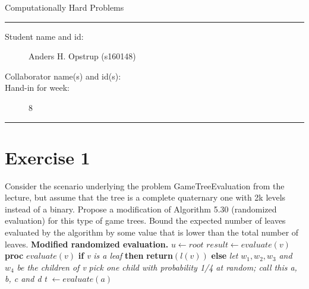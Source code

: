 \documentclass[11pt]{article}
\begin{document}
\begin{center}
{{\Large \sc Computationally Hard Problems}}
\end{center}
\rule{\textwidth}{1pt}
\begin{description}
\item[Student name and id:] Anders H. Opstrup (s160148)
\item[Collaborator name(s) and id(s):]
\item[Hand-in for week:] 8
\end{description}
\rule{\textwidth}{1pt}


\section*{Exercise 1}

Consider the scenario underlying the problem GameTreeEvaluation from the lecture, but assume that the tree is a complete quaternary one with 2k levels instead of a binary. Propose a modification of Algorithm 5.30 (randomized evaluation) for this type of game trees. Bound the expected number of leaves evaluated by the algorithm by some value that is lower than the total number of leaves. \newline \newline
\textbf{Modified randomized evaluation.} \newline \newline
$u \leftarrow root$ \newline
$result \leftarrow evaluate(v)$ \newline \newline
\textbf{proc} $evaluate(v)$ \newline
\textbf{if} \textit{v is a leaf} \textbf{then} \newline
\textbf{return}$(l(v))$ \newline
\textbf{else} \newline
\textit{let} $w_{1}, w_{2}, w_{3}$ \textit{and} $w_{4}$ \textit{be the children of v} \newline
\textit{pick one child with probability 1/4 at random; call this a, b, c and d} \newline
\textit{t} $\leftarrow evaluate(a)$ \newline
\end{document}
